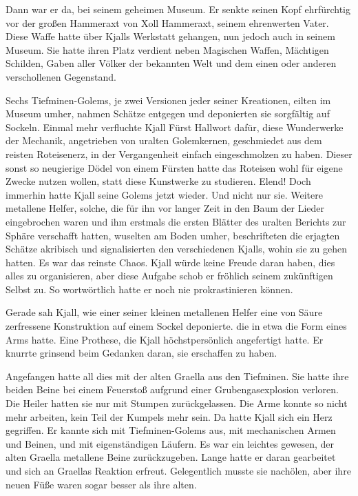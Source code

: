 Dann war er da, bei seinem geheimen Museum. Er senkte seinen Kopf ehrfürchtig vor der großen Hammeraxt von Xoll Hammeraxt, seinem ehrenwerten Vater. Diese Waffe hatte über Kjalls Werkstatt gehangen, nun jedoch auch in seinem Museum. Sie hatte ihren Platz verdient neben Magischen Waffen, Mächtigen Schilden, Gaben aller Völker der bekannten Welt und dem einen oder anderen verschollenen Gegenstand.

Sechs Tiefminen-Golems, je zwei Versionen jeder seiner Kreationen, eilten im Museum umher, nahmen Schätze entgegen und deponierten sie sorgfältig auf Sockeln. Einmal mehr verfluchte Kjall Fürst Hallwort dafür, diese Wunderwerke der Mechanik, angetrieben von uralten Golemkernen, geschmiedet aus dem reisten Roteisenerz, in der Vergangenheit einfach eingeschmolzen zu haben. Dieser sonst so neugierige Dödel von einem Fürsten hatte das Roteisen wohl für eigene Zwecke nutzen wollen, statt diese Kunstwerke zu studieren. Elend! Doch immerhin hatte Kjall seine Golems jetzt wieder. Und nicht nur sie. Weitere metallene Helfer, solche, die für ihn vor langer Zeit in den Baum der Lieder eingebrochen waren und ihm erstmals die ersten Blätter des uralten Berichts zur Sphäre verschafft hatten, wuselten am Boden umher, beschrifteten die erjagten Schätze akribisch und signalisierten den verschiedenen Kjalls, wohin sie zu gehen hatten. Es war das reinste Chaos. Kjall würde keine Freude daran haben, dies alles zu organisieren, aber diese Aufgabe schob er fröhlich seinem zukünftigen Selbst zu. So wortwörtlich hatte er noch nie prokrastinieren können.

Gerade sah Kjall, wie einer seiner kleinen metallenen Helfer eine von Säure zerfressene Konstruktion auf einem Sockel deponierte. die in etwa die Form eines Arms hatte. Eine Prothese, die Kjall höchstpersönlich angefertigt hatte. Er knurrte grinsend beim Gedanken daran, sie erschaffen zu haben.

Angefangen hatte all dies mit der alten Graella aus den Tiefminen. Sie hatte ihre beiden Beine bei einem Feuerstoß aufgrund einer Grubengasexplosion verloren. Die Heiler hatten sie nur mit Stumpen zurückgelassen. Die Arme konnte so nicht mehr arbeiten, kein Teil der Kumpels mehr sein. Da hatte Kjall sich ein Herz gegriffen. Er kannte sich mit Tiefminen-Golems aus, mit mechanischen Armen und Beinen, und mit eigenständigen Läufern. Es war ein leichtes gewesen, der alten Graella metallene Beine zurückzugeben. Lange hatte er daran gearbeitet und sich an Graellas Reaktion erfreut. Gelegentlich musste sie nachölen, aber ihre neuen Füße waren sogar besser als ihre alten.

